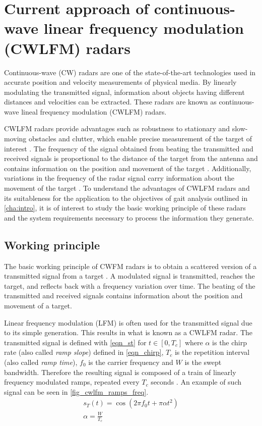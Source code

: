 \chapter{Current approach of continuous-wave linear frequency modulation (CWLFM) radars} \label{cha:generalities}


Continuous-wave (CW) radars are one of the state-of-the-art technologies used in accurate position and velocity measurements of physical media. By linearly modulating the transmitted signal, information about objects having different distances and velocities can be extracted. These radars are known as continuous-wave lineal frequency modulation (CWLFM) radars.

CWLFM radars provide advantages such as robustness to stationary and slow-moving obstacles and clutter, which enable precise measurement of the target of interest \cite{Richards2010}. The frequency of the signal obtained from beating the transmitted and received signals is proportional to the distance of the target from the antenna and contains information on the position and movement of the target \cite[p.~20-27]{Richards2010} \cite{Wang2014}. Additionally, variations in the frequency of the radar signal carry information about the movement of the target \cite{Kernec2019,Gurbuz2019}. To understand the advantages of CWLFM radars and its suitableness for the application to the objectives of gait analysis outlined in \cref{cha:intro}, it is of interest to study the basic working principle of these radars and the system requirements necessary to process the information they generate.

\section{Working principle} \label{sec:cwlfm_wp}

The basic working principle of CWFM radars is to obtain a scattered version of a transmitted signal from a target \cite{Ziemer2009}. A modulated signal is transmitted, reaches the target, and reflects back with a frequency variation over time. The beating of the transmitted and received signals contains information about the position and movement of a target.

Linear frequency modulation (LFM) is often used for the transmitted signal due to its simple generation. This results in what is known as a CWLFM radar. The transmitted signal is defined with \cref{eqn_st} \cite{Ziemer2009} for $t \in [0, T_c]$ where $\alpha$ is the chirp rate (also called \textit{ramp slope}) defined in \cref{eqn_chirp}, $T_c$ is the repetition interval (also called \textit{ramp time}), $f_0$ is the carrier frequency and $W$ is the swept bandwidth. Therefore the resulting signal is composed of a train of linearly frequency modulated ramps, repeated every $T_c$ seconds \cite{Sardinero2022}. An example of such signal can be seen in \cref{fig_cwlfm_ramps_freq}.
\begin{gather}
	s_T(t) = \cos{\left(2 \pi f_0 t + \pi \alpha t^2\right)} \label{eqn_st}\\
	\alpha = \frac{W}{T_c} \label{eqn_chirp}
\end{gather}

